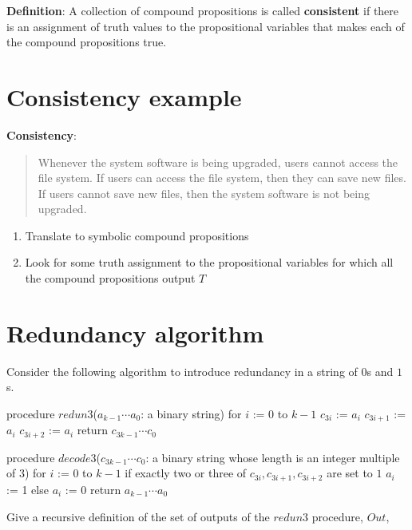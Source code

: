\documentclass[12pt, oneside]{article}
\begin{document}
{\bf Definition}: A collection of  compound  propositions
is called {\bf consistent} if  there
is  an assignment  of  truth values
to  the  propositional variables that makes
each of the compound propositions  true.
 \vfill
\section*{Consistency example}


{\bf Consistency}: 
\begin{quote}
Whenever the system software is being upgraded, users cannot access the file system. 
If users can access the file system, then they can save new files. 
If users cannot save new files, then the system software is not being upgraded.
\end{quote}

\begin{enumerate}
\item Translate to symbolic compound propositions
\vfill
\item Look for some truth assignment to the propositional variables for which all the compound propositions output $T$
\vfill
\end{enumerate} \vfill
\section*{Redundancy algorithm}


Consider the following algorithm to introduce redundancy in a string of $0$s and $1$s.
\begin{algorithm}[caption={Create redundancy by repeating each bit three times}]
procedure $\textit{redun3}$($a_{k-1} \cdots a_0$: a binary string)
for $i$ := $0$ to $k-1$
  $c_{3i}$ := $a_i$
  $c_{3i+1}$ := $a_i$
  $c_{3i+2}$ := $a_i$
return $c_{3k-1} \cdots c_0$
\end{algorithm}

\begin{algorithm}[caption={Decode sequence of bits using majority rule on consecutive three bit sequences}]
procedure $\textit{decode3}$($c_{3k-1} \cdots c_0$: a binary string whose length is an integer multiple of $3$)
for $i$ := $0$ to $k-1$
  if exactly two or three of $c_{3i}, c_{3i+1}, c_{3i+2}$ are set to $1$
    $a_i$ := 1
  else 
    $a_i$ := 0
return $a_{k-1} \cdots a_0$
\end{algorithm}

Give a recursive definition of the set of outputs of the $redun3$ procedure, $Out$,
\end{document}
